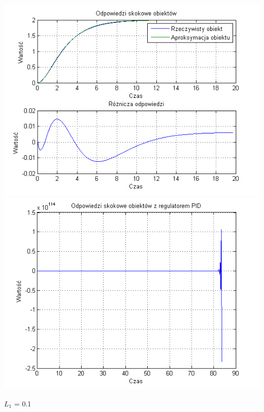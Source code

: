 \documentclass[10pt,a4paper]{article}
\begin{document}
\begin{center}
\includegraphics[scale=1]{images/dwa/skrypt_175.png}\\
\includegraphics[scale=1]{images/dwa/skrypt_176.png}\\
\end{center}
\newpage
$L_1$ = 0.1
\end{document}
